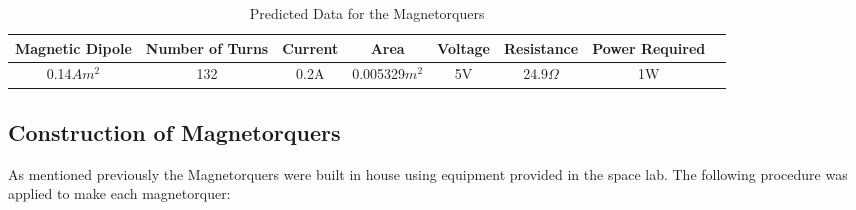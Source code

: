\begin{table}[H]
\begin{center}
\caption{Predicted Data for the Magnetorquers}
\begin{tabular}{|c|c|c|c|c|c|c|c|}
\hline
Magnetic Dipole & Number of Turns & Current & Area & Voltage & Resistance & Power Required\\
\hline
0.14$Am^2$ & 132 & 0.2A & 0.005329$m^2$ & 5V & 24.9$\Omega$ & 1W\\
\hline
\end{tabular}
\end{center}
\vspace{-6mm}
\end{table}

\subsection{Construction of Magnetorquers}
As mentioned previously the Magnetorquers were built in house using equipment provided in the space lab.  The following procedure was applied to make each magnetorquer:
